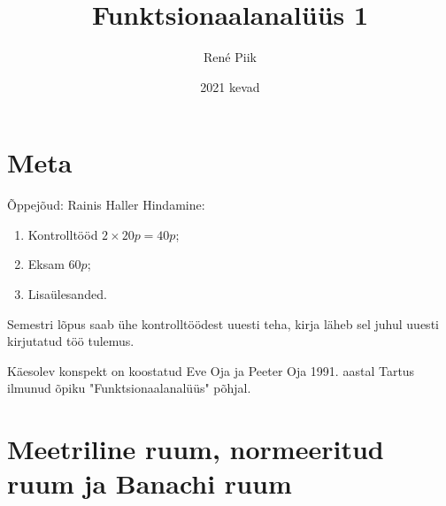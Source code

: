 \documentclass{article}[12pt]
\theoremstyle{definition}
\theoremstyle{definition}
\theoremstyle{definition}
\theoremstyle{break}
\begin{document}
\title{Funktsionaalanalüüs 1}
\author{René Piik}
\date{2021 kevad}

\maketitle

\section*{Meta}

Õppejõud: Rainis Haller \newline
Hindamine:
\begin{enumerate}
	\item Kontrolltööd $2\times 20p = 40p$;
	\item Eksam $60p$;
	\item Lisaülesanded.
\end{enumerate}
Semestri lõpus saab ühe kontrolltöödest uuesti teha, kirja läheb sel juhul uuesti kirjutatud töö tulemus.

Käesolev konspekt on koostatud Eve Oja ja Peeter Oja 1991. aastal Tartus ilmunud õpiku "Funktsionaalanalüüs" põhjal.

\tableofcontents

\section{Meetriline ruum, normeeritud ruum ja Banachi ruum}
\end{document}
